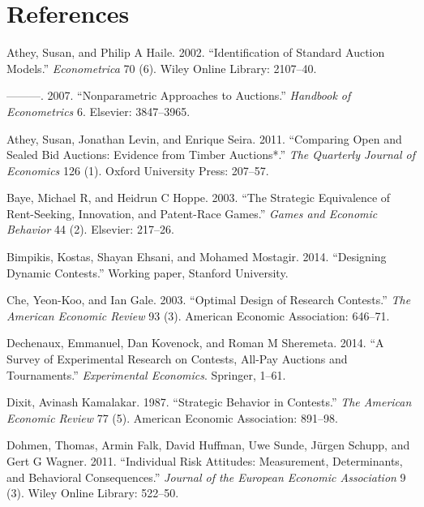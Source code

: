 \documentclass[10pt, titlepage]{article}
\begin{document}
\section*{References}\label{references}

\hypertarget{refs}{}
\hypertarget{ref-athey2002identification}{}
Athey, Susan, and Philip A Haile. 2002. ``Identification of Standard
Auction Models.'' \emph{Econometrica} 70 (6). Wiley Online Library:
2107--40.

\hypertarget{ref-athey2007nonparametric}{}
---------. 2007. ``Nonparametric Approaches to Auctions.''
\emph{Handbook of Econometrics} 6. Elsevier: 3847--3965.

\hypertarget{ref-athey2011comparing}{}
Athey, Susan, Jonathan Levin, and Enrique Seira. 2011. ``Comparing Open
and Sealed Bid Auctions: Evidence from Timber Auctions*.'' \emph{The
Quarterly Journal of Economics} 126 (1). Oxford University Press:
207--57.

\hypertarget{ref-baye2003strategic}{}
Baye, Michael R, and Heidrun C Hoppe. 2003. ``The Strategic Equivalence
of Rent-Seeking, Innovation, and Patent-Race Games.'' \emph{Games and
Economic Behavior} 44 (2). Elsevier: 217--26.

\hypertarget{ref-bimpikis2014designing}{}
Bimpikis, Kostas, Shayan Ehsani, and Mohamed Mostagir. 2014. ``Designing
Dynamic Contests.'' Working paper, Stanford University.

\hypertarget{ref-che2003optimal}{}
Che, Yeon-Koo, and Ian Gale. 2003. ``Optimal Design of Research
Contests.'' \emph{The American Economic Review} 93 (3). American
Economic Association: 646--71.

\hypertarget{ref-dechenaux2014survey}{}
Dechenaux, Emmanuel, Dan Kovenock, and Roman M Sheremeta. 2014. ``A
Survey of Experimental Research on Contests, All-Pay Auctions and
Tournaments.'' \emph{Experimental Economics}. Springer, 1--61.

\hypertarget{ref-dixit1987strategic}{}
Dixit, Avinash Kamalakar. 1987. ``Strategic Behavior in Contests.''
\emph{The American Economic Review} 77 (5). American Economic
Association: 891--98.

\hypertarget{ref-dohmen2011individual}{}
Dohmen, Thomas, Armin Falk, David Huffman, Uwe Sunde, Jürgen Schupp, and
Gert G Wagner. 2011. ``Individual Risk Attitudes: Measurement,
Determinants, and Behavioral Consequences.'' \emph{Journal of the
European Economic Association} 9 (3). Wiley Online Library: 522--50.
\end{document}

